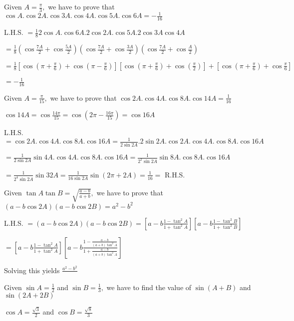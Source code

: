 \item Given $A = \frac{\pi}{3},$ we have to prove that $\cos A.\cos 2A. \cos 3A.\cos 4A.\cos 5A.\cos 6A = -\frac{1}{16}$

  L.H.S. $= \frac{1}{8}2\cos A.\cos 6A.2\cos 2A.\cos 5A.2\cos 3A\cos 4A$

  $= \frac{1}{8}\left(\cos \frac{7A}{2} + \cos \frac{5A}{2}\right)\left(\cos \frac{7A}{2} + \cos
  \frac{3A}{2}\right)\left(\cos \frac{7A}{2} + \cos \frac{A}{2}\right)$

  $= \frac{1}{8}\left[\cos\left(\pi + \frac{\pi}{6}\right) + \cos \left(\pi -
    \frac{\pi}{6}\right)\right]\left[\cos\left(\pi + \frac{\pi}{6}\right) + \cos \left(\frac{\pi}{2}\right)\right] +
  \left[\cos\left(\pi + \frac{\pi}{6}\right) + \cos \frac{\pi}{6}\right]$

  $= -\frac{1}{16}$

\item Given $A = \frac{\pi}{15},$ we have to prove that $\cos2A.\cos4A.\cos8A.\cos14A = \frac{1}{16}$

  $\cos 14A = \cos \frac{14\pi}{15} = \cos \left(2\pi - \frac{16\pi}{15}\right) = \cos 16A$

  L.H.S. $= \cos2A.\cos4A.\cos8A.\cos16A = \frac{1}{2\sin2A}.2\sin2A.\cos2A.\cos4A.\cos8A.\cos16A$

  $= \frac{1}{2\sin2A}\sin4A.\cos4A.\cos8A.\cos16A = \frac{1}{2^2\sin 2A}\sin8A.\cos8A.\cos16A$

  $= \frac{1}{2^4\sin 2A}\sin32A = \frac{1}{16\sin2A}\sin(2\pi + 2A) = \frac{1}{16} =$ R.H.S.

\item Given $\tan A\tan B = \sqrt{\frac{a - b}{a + b}},$ we have to prove that $(a - b\cos2A)(a - b\cos2B) = a^2 -
  b^2$

  L.H.S. $= (a - b\cos2A)(a - b\cos2B) = \left[a -b\frac{1 - \tan^2A}{1 + \tan^2A}\right]\left[a - b\frac{1 - \tan^2B}{1 +
      \tan^2B}\right]$

  $= \left[a -b\frac{1 - \tan^2A}{1 + \tan^2A}\right]\left[a - b\frac{1 - \frac{a - b}{(a + b)\tan^2A}}{1 + \frac{a -
        b}{(a + b)\tan^2A}}\right]$

  Solving this yields $\frac{a^2 - b^2}{}$

\item Given $\sin A = \frac{1}{2}$ and $\sin B = \frac{1}{3},$ we have to find the value of $\sin(A + B)$ and
  $\sin(2A + 2B)$

  $\cos A = \frac{\sqrt{3}}{2}$ and $\cos B = \frac{\sqrt{8}}{3}$

